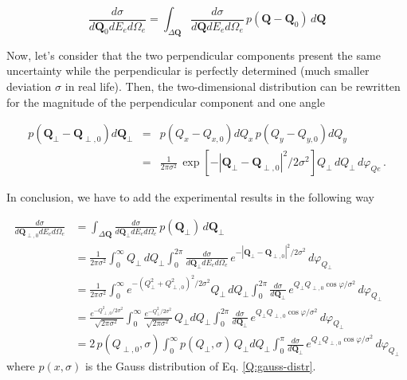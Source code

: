 \[
\frac{d \sigma}{d \bm{Q}_{0} d E_{e} d \Omega_{e}} = \int_{\Delta \bm{Q}} \frac{d \sigma}{d \bm{Q} d E_{e} d \Omega_{e}}\, p( \bm{Q} - \bm{Q}_{0} ) \, d \bm{Q}
\]

Now, let's consider that the two perpendicular components present the same uncertainty while the perpendicular is perfectly determined (much smaller deviation $\sigma$ in real life). Then, the two-dimensional distribution can be rewritten for the magnitude of the perpendicular component and one angle


\begin{eqnarray*}
  p(\bm{Q}_{\perp} - \bm{Q}_{{\perp},0}) d\bm{Q}_{\perp} &=&  p(Q_{x}-Q_{x,0}) dQ_{x} \, p(Q_{y}-Q_{y,0}) d Q_{y} \\
&=& \frac{1}{2 \pi \sigma^2} \, \exp \left[{- \left|\bm{Q}_{\perp} - \bm{Q}_{{\perp},0}\right|^{2} / 2\sigma^{2}} \right] Q_{\perp} \, dQ_{\perp} \, d \varphi_{Qe} \, .
\end{eqnarray*}



In conclusion, we have to add the experimental results in the following way

\begin{align}\label{Q:convol-exact}
 \frac{d \sigma}{d \bm{Q}_{\perp , 0} d E_{e} d \Omega_{e}} &= \int_{\Delta \bm{Q}} \frac{d \sigma}{d \bm{Q}_{\perp} d E_{e} d \Omega_{e}}\, p( \bm{Q}_{\perp} ) \, d \bm{Q}_{\perp} \nonumber \\
&= \frac{1}{2 \pi \sigma^{2}} \int_{0}^{\infty} Q_{\perp} \, d Q_{\perp} \int_{0}^{2 \pi}  \frac{d \sigma}{ d \bm{Q}_{\perp} d E_{e} d \Omega_{e}}\, e^{- \left|\bm{Q}_{\perp} - \bm{Q}_{{\perp},0}\right|^{2} / 2\sigma^{2}} \, d \varphi_{Q_{\perp}} \nonumber \\
&= \frac{1}{2 \pi \sigma^{2}} \int_{0}^{\infty} e^{- \left({Q}^{2}_{\perp} + {Q}^{2}_{{\perp},0}\right)^{2} / 2\sigma^{2}}  Q_{\perp} \, d Q_{\perp} \int_{0}^{2 \pi}  \frac{d \sigma}{ d \bm{Q}_{\perp}}\, e^{{Q}_{\perp} {Q}_{{\perp},0} \cos{\varphi}/\sigma^{2}} \, d \varphi_{Q_{\perp}}
\nonumber \\
&= \frac{e^{- Q^{2}_{{\perp},0} / 2\sigma^{2}} } {\sqrt{2 \pi \sigma^{2}}} \int_{0}^{\infty}   \frac{e^{- Q^{2}_{{\perp}} / 2\sigma^{2}} } {\sqrt{2 \pi \sigma^{2}}} \, Q_{\perp} d Q_{\perp} \int_{0}^{2 \pi}  \frac{d \sigma}{ d \bm{Q}_{\perp}}\, e^{{Q}_{\perp} {Q}_{{\perp},0} \cos{\varphi}/\sigma^{2}} \, d \varphi_{Q_{\perp}}
\nonumber \\
&= 2\, p(Q_{\perp,0},\sigma) \int_{0}^{\infty}  p(Q_{\perp},\sigma) \, Q_{\perp} d Q_{\perp} \int_{0}^{\pi}  \frac{d \sigma}{ d \bm{Q}_{\perp}}\, e^{{Q}_{\perp} {Q}_{{\perp},0} \cos{\varphi}/\sigma^{2}} \, d \varphi_{Q_{\perp}} 
\end{align}
%
where $p(x,\sigma)$ is the Gauss distribution of Eq. \ref{Q:gauss-distr}.



